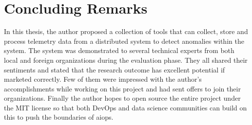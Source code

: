 \section{Concluding Remarks}

In this thesis, the author proposed a collection of tools that can collect, store and process telemetry data from a distributed system to detect anomalies within the system. The system was demonstrated to several technical experts from both local and foreign organizations during the evaluation phase. They all shared their sentiments and stated that the research outcome has excellent potential if marketed correctly. Few of them were impressed with the author's accomplishments while working on this project and had sent offers to join their organizations. Finally the author hopes to open source the entire project under the MIT license so that both DevOps and data science communities can build on this to push the boundaries of \ac{aiops}.